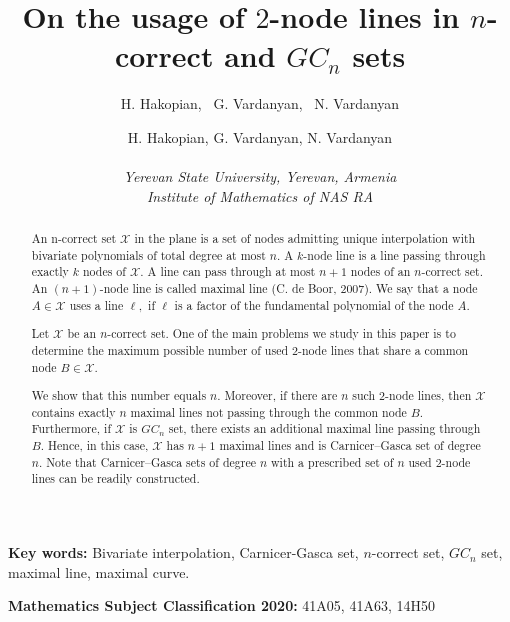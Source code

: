 \documentclass[a4paper,12pt]{article}
\theoremstyle{definition}
\numberwithin{equation}{section}
\numberwithin{figure}{section}
\newcommand{\Xset}{\mathcal{X}}
\begin{document}
\title{\large{On the usage of $2$-node lines in $n$-correct and $GC_n$ sets}}

\author{H. Hakopian, \  G. Vardanyan, \  N. Vardanyan}

\author{H. Hakopian, G. Vardanyan, N. Vardanyan\\ \\
 \textit{Yerevan State University, Yerevan, Armenia}\\   \textit{Institute of Mathematics of NAS RA}}
\date{}
\maketitle

\begin{abstract} 
An n-correct set $\Xset$ in the plane is a set of nodes admitting unique
 interpolation with bivariate polynomials of total degree at most $n$.
A $k$-node line is a line passing through exactly $k$ nodes of $\Xset.$ A line can pass through at most $n+1$ nodes of an $n$-correct set. An $(n+1)$-node line is called maximal line (C. de Boor, 2007). We say that a node $A\in\Xset$ uses a line $\ell,$ if $\ell$ is a factor of the fundamental polynomial of the node $A.$

Let $\Xset$ be an $n$-correct set.
One of the main problems we study in this paper is to determine the maximum possible number of used $2$-node lines that share a common node $B \in \mathcal{X}$.

 
We show that this number equals $n$. Moreover,  if there are $n$ such $2$-node lines, then $\mathcal{X}$ contains exactly $n$ maximal lines not passing through the common node $B$. Furthermore, if $\mathcal{X}$ is $GC_n$ set, there exists an additional maximal line passing through $B$. Hence, in this case, $\mathcal{X}$ has $n+1$ maximal lines and is Carnicer–Gasca set of degree $n$. Note that Carnicer–Gasca sets of degree $n$ with a prescribed set of $n$ used $2$-node lines can be readily constructed.
\end{abstract}

{\bf Key words:}
Bivariate interpolation, Carnicer-Gasca set, $n$-correct set, $GC_n$ set, maximal line, maximal curve.


{\bf Mathematics Subject Classification 2020:} 41A05, 41A63, 14H50

\end{document}
